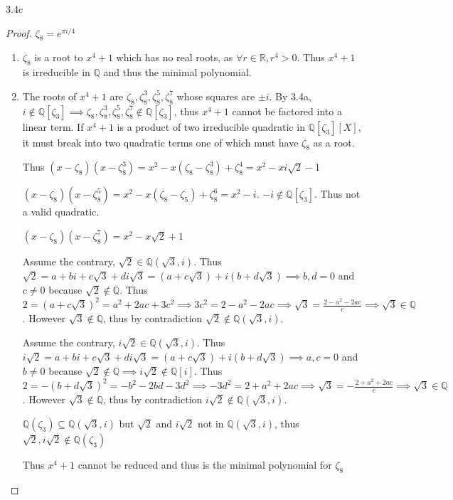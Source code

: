 \documentclass{article}
\newcommand{\R}{\mathbb{R}}
\newcommand{\Q}{\mathbb{Q}}
\begin{document}
\begin{PROB}{3.4c}\label{Problem 3.4c.}
\end{PROB}
\begin{proof}
    $\zeta_8 = e^{\pi i / 4}$
    \begin{enumerate}
        \item $\zeta_8$ is a root to $x^4 + 1$ which has no real roots, as $\forall r \in \R, r^4 > 0$. Thus $x^4 + 1$ is irreducible in $\Q$ and thus the minimal polynomial. 
        \item The roots of $x^4 + 1$ are $\zeta_8, \zeta_8^3, \zeta_8^5, \zeta_8^7$ whose squares are $\pm i$. By 3.4a, $i \not \in \Q[\zeta_3] \implies \zeta_8, \zeta_8^3, \zeta_8^5, \zeta_8^7 \not \in \Q[\zeta_3]$, thus $x^4 + 1$ cannot be factored into a linear term. If $x^4 + 1$ is a product of two irreducible quadratic in $\Q[\zeta_3][X]$, it must break into two quadratic terms one of which must have $\zeta_8$ as a root.
        
        Thus $(x - \zeta_8)(x - \zeta_8^3) = x^2 - x(\zeta_8 - \zeta_8^3) + \zeta_8^4 =  x^2 - xi\sqrt{2} - 1$

        $(x - \zeta_8)(x - \zeta_8^5) = x^2 - x(\zeta_8 - \zeta_5) + \zeta_8^6 = x^2 - i$. $-i \not \in \Q[\zeta_3]$. Thus not a valid quadratic. 
        
        
        $(x - \zeta_8)(x - \zeta_8^7) = x^2 - x\sqrt{2} + 1$
        
        Assume the contrary, $\sqrt{2} \in \Q(\sqrt{3}, i)$. Thus $\sqrt{2} = a + bi + c\sqrt{3} + di\sqrt{3} = (a + c\sqrt{3}) + i(b + d\sqrt{3}) \implies b, d =0$ and $c \neq 0$ because $\sqrt{2} \not \in \Q$. Thus $2 = (a + c\sqrt{3})^2 = a^2 + 2ac + 3c^2 \implies 3c^2 = 2 - a^2 - 2ac \implies \sqrt{3} = \frac{2 - a^2 - 2ac}{c} \implies \sqrt{3} \in \Q$. However $\sqrt{3} \not \in \Q$, thus by contradiction $\sqrt{2} \not \in \Q(\sqrt{3}, i)$.


        Assume the contrary, $i\sqrt{2} \in \Q(\sqrt{3}, i)$. Thus $i\sqrt{2} = a + bi + c\sqrt{3} + di\sqrt{3} = (a + c\sqrt{3}) + i(b + d\sqrt{3}) \implies a, c =0$ and $b \neq 0$ because $\sqrt{2} \not \in \Q \implies i\sqrt{2} \not \in \Q[i]$. Thus $2 = -(b + d\sqrt{3})^2 = -b^2 - 2bd - 3d^2 \implies -3d^2 = 2 + a^2 + 2ac \implies \sqrt{3} = -\frac{2 + a^2 + 2ac}{c} \implies \sqrt{3} \in \Q$. However $\sqrt{3} \not \in \Q$, thus by contradiction $i\sqrt{2} \not \in \Q(\sqrt{3}, i)$.      

        
        $\Q(\zeta_3) \subseteq \Q(\sqrt{3}, i)$ but $\sqrt{2}$ and $i\sqrt{2}$ not in $\Q(\sqrt{3}, i)$, thus $\sqrt{2}, i\sqrt{2} \not \in \Q(\zeta_3)$
        
        
        Thus $x^4 + 1$ cannot be reduced and thus is the minimal polynomial for $\zeta_8$ 
    \end{enumerate}
\end{proof}
\end{document}
